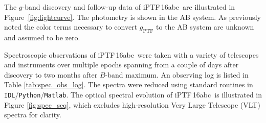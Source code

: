 \documentclass[twocolumn]{aastex61}
\newcommand{\abc}{iPTF\,16abc}
\begin{document}
The $g$-band discovery and follow-up data of \abc\ are 
illustrated in Figure~\ref{fig:lightcurve}.  The photometry is shown in the AB system. As previously noted the color terms necessary to convert $g_\mathrm{PTF}$ to the AB system are unknown and assumed to be zero.

Spectroscopic observations of \abc\ were taken with a variety
of telescopes and instruments over multiple epochs spanning from a
couple of days after discovery to two months after $B$-band maximum. 
An observing log is listed in Table \ref{tab:spec_obs_log}. The spectra were reduced using standard routines in \texttt{IDL}/\texttt{Python}/\texttt{Matlab}. The optical
spectral evolution of \abc\ is illustrated in Figure
\ref{fig:spec_seq}, which excludes high-resolution Very Large Telescope (VLT) spectra for clarity.
\end{document}
